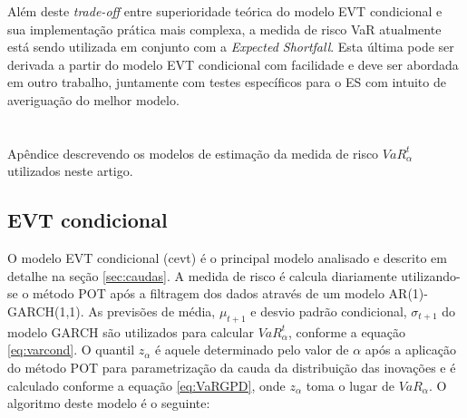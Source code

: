 \documentclass[1p]{elsarticle}
\theoremstyle{definition}
\begin{document}

Além deste \emph{trade-off} entre superioridade teórica do modelo EVT condicional e sua implementação prática mais complexa, a medida de risco VaR atualmente está sendo utilizada em conjunto com a \emph{Expected Shortfall}. Esta última pode ser derivada a partir do modelo EVT condicional com facilidade e deve ser abordada em outro trabalho, juntamente com testes específicos para o ES com intuito de averiguação do melhor modelo. 

\appendix
\section{}
\label{apendice}

Apêndice descrevendo os modelos de estimação da medida de risco $VaR^t_\alpha$ utilizados neste artigo.

\subsection{EVT condicional}
\label{sec:appendix_cevt}

O modelo EVT condicional (cevt) é o principal modelo analisado e descrito em detalhe na seção \ref{sec:caudas}. A medida de risco é calcula diariamente utilizando-se o método POT após a filtragem dos dados através de um modelo AR(1)-GARCH(1,1). As previsões de média, $\mu_{t+1}$ e desvio padrão condicional, $\sigma_{t+1}$ do modelo GARCH são utilizados para calcular $VaR^t_\alpha$, conforme a equação \ref{eq:varcond}. O quantil $z_\alpha$ é aquele determinado pelo valor de $\alpha$ após a aplicação do método POT para parametrização da cauda da distribuição das inovações e é calculado conforme a equação \eqref{eq:VaRGPD}, onde $z_\alpha$ toma o lugar de $VaR_\alpha$. O algoritmo deste modelo é o seguinte:
\end{document}
